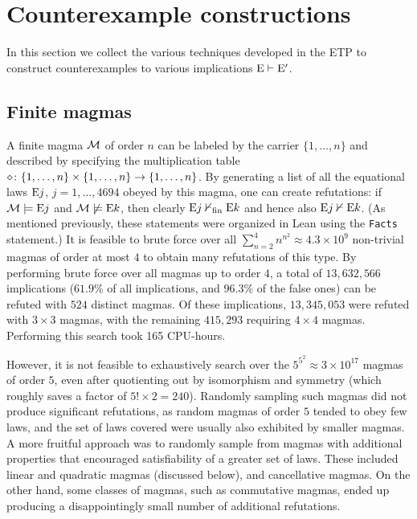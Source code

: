 
\section{Counterexample constructions}

In this section we collect the various techniques developed in the ETP to construct counterexamples to various implications $\mathrm{E} \vdash {\mathrm{E}'}$.

\subsection{Finite magmas}\label{finite-sec}

A finite magma ${\mathcal{M}}$ of order $n$ can be labeled by the carrier $\{1,\dots,n\}$ and described by specifying the multiplication table $\diamond \colon \{1,\dots,n\} \times \{1,\dots,n\} \to \{1,\dots,n\}$.  By generating a list of all the equational laws $\mathrm{E}j$, $j=1,\dots,4694$ obeyed by this magma, one can create refutations: if ${\mathcal{M}} \models \mathrm{E}j$ and ${\mathcal{M}} \not \models \mathrm{E}k$, then clearly $\mathrm{E}j \nvdash_{\mathrm{fin}} \mathrm{E}k$ and hence also $\mathrm{E}j \nvdash \mathrm{E}k$.  (As mentioned previously, these statements were organized in Lean using the \texttt{Facts} statement.) It is feasible to brute force over all $\sum_{n=2}^4 n^{n^2} \approx 4.3 \times 10^9$ non-trivial magmas of order at most $4$ to obtain many refutations of this type.
By performing brute force over all magmas up to order $4$, a total of $13,632,566$ implications ($61.9\%$ of all implications, and $96.3\%$ of the false ones) can be refuted with $524$ distinct magmas. Of these implications, $13,345,053$ were refuted with $3 \times 3$ magmas, with the remaining $415,293$ requiring $4 \times 4$ magmas. Performing this search took 165 CPU-hours.

However, it is not feasible to exhaustively search over the $5^{5^2} \approx 3 \times 10^{17}$ magmas of order $5$, even after quotienting out by isomorphism and symmetry (which roughly saves a factor of $5! \times 2 = 240$).  Randomly sampling such magmas did not produce significant refutations, as random magmas of order $5$ tended to obey few laws, and the set of laws covered were usually also exhibited by smaller magmas.  A more fruitful approach was to randomly sample from magmas with additional properties that encouraged satisfiability of a greater set of laws.  These included linear and quadratic magmas (discussed below), and cancellative magmas.  On the other hand, some classes of magmas, such as commutative magmas, ended up producing a disappointingly small number of additional refutations.

